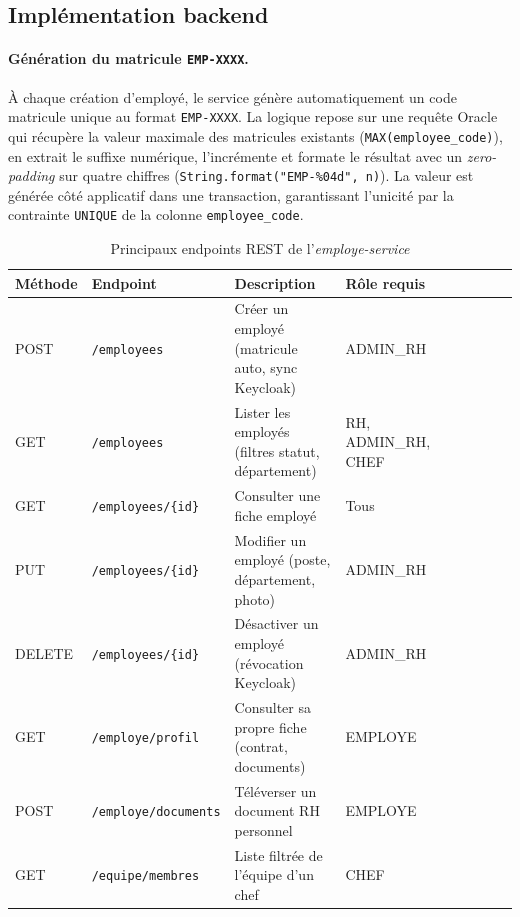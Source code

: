 \subsection{Implémentation backend}

\paragraph{Génération du matricule \texttt{EMP-XXXX}.}
À chaque création d'employé, le service génère automatiquement un code matricule
unique au format \texttt{EMP-XXXX}. La logique repose sur une requête Oracle qui
récupère la valeur maximale des matricules existants (\texttt{MAX(employee\_code)}),
en extrait le suffixe numérique, l'incrémente et formate le résultat avec un
\textit{zero-padding} sur quatre chiffres (\texttt{String.format("EMP-\%04d", n)}).
La valeur est générée côté applicatif dans une transaction, garantissant l'unicité
par la contrainte \texttt{UNIQUE} de la colonne \texttt{employee\_code}.

\begin{table}[H]
\centering
\caption{Principaux endpoints REST de l'\textit{employe-service}}
\label{tab:api_employe}
\begin{tabularx}{\textwidth}{VlVlVLVlV}
\hline
\textbf{Méthode} & \textbf{Endpoint} & \textbf{Description} & \textbf{Rôle requis} \\
\hline
POST & \texttt{/employees} & Créer un employé (matricule auto, sync Keycloak) & ADMIN\_RH \\
\hline
GET & \texttt{/employees} & Lister les employés (filtres statut, département) & RH, ADMIN\_RH, CHEF \\
\hline
GET & \texttt{/employees/\{id\}} & Consulter une fiche employé & Tous \\
\hline
PUT & \texttt{/employees/\{id\}} & Modifier un employé (poste, département, photo) & ADMIN\_RH \\
\hline
DELETE & \texttt{/employees/\{id\}} & Désactiver un employé (révocation Keycloak) & ADMIN\_RH \\
\hline
GET & \texttt{/employe/profil} & Consulter sa propre fiche (contrat, documents) & EMPLOYE \\
\hline
POST & \texttt{/employe/documents} & Téléverser un document RH personnel & EMPLOYE \\
\hline
GET & \texttt{/equipe/membres} & Liste filtrée de l'équipe d'un chef & CHEF \\
\hline
\end{tabularx}
\end{table}


